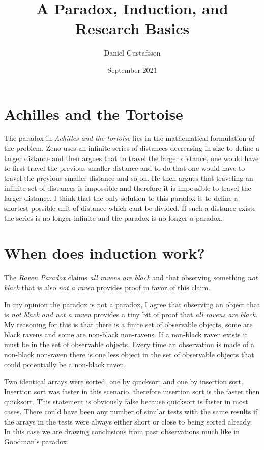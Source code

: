 \documentclass[11pt,a4paper]{article}
\title{A Paradox, Induction, and Research Basics}
\author{Daniel Gustafsson}
\date{September 2021}
\begin{document}
\maketitle

\section{Achilles and the Tortoise}
The paradox in \textit{Achilles and the tortoise} lies in the mathematical formulation of the problem.
Zeno uses an infinite series of distances decreasing in size to define a larger distance and then argues that to travel the larger distance,
one would have to first travel the previous smaller distance and to do that one would have to travel the previous smaller distance and so on.
He then argues that traveling an infinite set of distances is impossible and therefore it is impossible to travel the larger distance.
I think that the only solution to this paradox is to define a shortest possible unit of distance which cant be divided. 
If such a distance exists the series is no longer infinite and the paradox is no longer a paradox.


\section{When does induction work?}
The \textit{Raven Paradox} claims \textit{all ravens are black} and that observing something \textit{not black} that is also \textit{not a raven}
provides proof in favor of this claim.

In my opinion the paradox is not a paradox, I agree that observing an object that is \textit{not black and not a raven} provides a tiny bit of proof
that \textit{all ravens are black}. My reasoning for this is that there is a finite set of observable objects, some are black ravens and some are
non-black non-ravens. If a non-black raven exists it must be in the set of observable objects. Every time an observation is made of a non-black non-raven
there is one less object in the set of observable objects that could potentially be a non-black raven.

Two identical arrays were sorted, one by quicksort and one by insertion sort. Insertion sort was faster in this scenario,
therefore insertion sort is the faster then quicksort. This statement is obviously false because quicksort is faster in most cases.
There could have been any number of similar tests with the same results if the arrays in the tests were always either short or close to being
sorted already. In this case we are drawing conclusions from past observations much like in Goodman's paradox.
\end{document}
